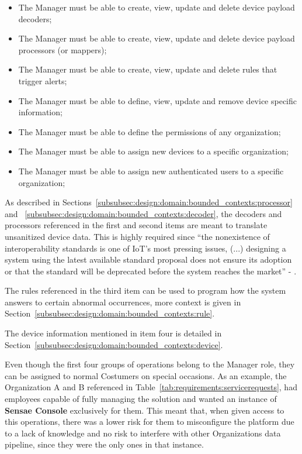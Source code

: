 \begin{itemize}
    \item The Manager must be able to create, view, update and delete device payload decoders;
    \item The Manager must be able to create, view, update and delete device payload processors (or mappers);
    \item The Manager must be able to create, view, update and delete rules that trigger alerts;
    \item The Manager must be able to define, view, update and remove device specific information;
    \item The Manager must be able to define the permissions of any organization;
    \item The Manager must be able to assign new devices to a specific organization;
    \item The Manager must be able to assign new authenticated users to a specific organization;
\end{itemize}

As described in Sections~\ref{subsubsec:design:domain:bounded_contexts:processor} and ~\ref{subsubsec:design:domain:bounded_contexts:decoder}, the decoders and processors referenced in the first and second items are meant to translate unsanitized device data. This is highly required since ``the nonexistence of interoperability standards is one of \gls{IoT}'s most pressing issues, (...) designing a system using the latest available standard proposal does not ensure its adoption or that the standard will be deprecated before the system reaches the market'' - \cite{DIAS2022100529}. 

The rules referenced in the third item can be used to program how the system answers to certain abnormal occurrences, more context is given in Section~\ref{subsubsec:design:domain:bounded_contexts:rule}.

The device information mentioned in item four is detailed in Section~\ref{subsubsec:design:domain:bounded_contexts:device}.

Even though the first four groups of operations belong to the Manager role, they can be assigned to normal Costumers on special occasions. As an example, the Organization A and B referenced in Table~\ref{tab:requirements:servicerequests}, had employees capable of fully managing the solution and wanted an instance of \textbf{Sensae Console} exclusively for them. This meant that, when given access to this operations, there was a lower risk for them to misconfigure the platform due to a lack of knowledge and no risk to interfere with other Organizations data pipeline, since they were the only ones in that instance.

